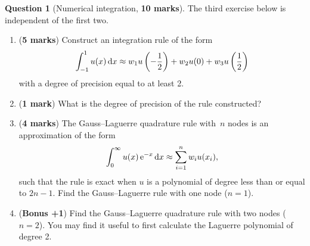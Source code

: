 \documentclass[11pt]{article}
\theoremstyle{definition}
\newtheorem{question}{Question}
\theoremstyle{remark}
\begin{document}
\newpage
\begin{question}
    [Numerical integration, \textbf{10 marks}]
    The third exercise below is independent of the first two.
    \begin{enumerate}
        \item (\textbf{5 marks})
            Construct an integration rule of the form
            \[
                \int_{-1}^{1} u(x) \, \mathrm d x \approx w_1 u\left(-\frac{1}{2} \right) + w_2 u(0) +  w_3 u\left(\frac{1}{2} \right)
            \]
            with a degree of precision equal to at least 2.

        \item
            (\textbf{1 mark})
            What is the degree of precision of the rule constructed?

        \item
            (\textbf{4 marks})
            The Gauss--Laguerre quadrature rule with~$n$ nodes is an approximation of the form
            \[
                \int_{0}^{\infty} u(x) \, \mathrm e^{-x} \, \mathrm d x \approx \sum_{i=1}^{n} w_i u(x_i),
            \]
            such that the rule is exact when $u$ is a polynomial of degree less than or equal to $2n-1$.
            Find the Gauss--Laguerre rule with one node ($n = 1$).

        \item (\textbf{Bonus +1})
            Find the Gauss--Laguerre quadrature rule with two nodes ($n = 2$).
            You may find it useful to first calculate the Laguerre polynomial of degree 2.
    \end{enumerate}
\end{question}
\end{document}

